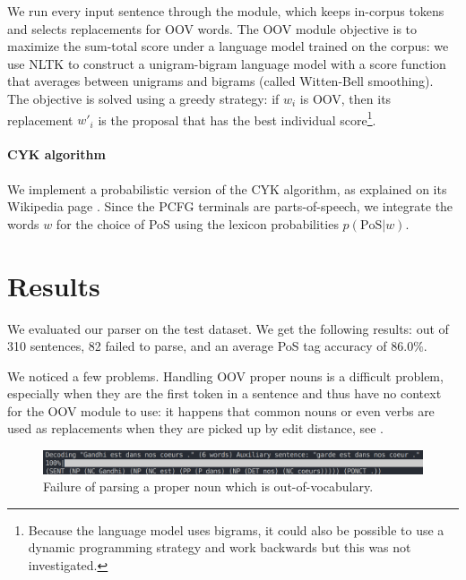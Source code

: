 \documentclass[11pt]{article}
\begin{document}
We run every input sentence through the module, which keeps in-corpus tokens and selects replacements for OOV words. The OOV module objective is to maximize the sum-total score under a language model trained on the corpus: we use NLTK to construct a unigram-bigram language model with a score function that averages between unigrams and bigrams (called Witten-Bell smoothing). The objective is solved using a greedy strategy: if $w_i$ is OOV, then its replacement $w'_i$ is the proposal that has the best individual score\footnote{Because the language model uses bigrams, it could also be possible to use a dynamic programming strategy and work backwards but this was not investigated.}.

\paragraph{CYK algorithm}

We implement a probabilistic version of the CYK algorithm, as explained on its Wikipedia page \cite{wiki:CYK}. Since the PCFG terminals are parts-of-speech, we integrate the words $w$ for the choice of PoS using the lexicon probabilities $p(\mathrm{PoS}|w)$.

\section{Results}


We evaluated our parser on the test dataset. We get the following results: out of 310 sentences, 82 failed to parse, and an average PoS tag accuracy of $86.0\%$.

We noticed a few problems. Handling OOV proper nouns is a difficult problem, especially when they are the first token in a sentence and thus have no context for the OOV module to use: it happens that common nouns or even verbs are used as replacements when they are picked up by edit distance, see .

\begin{figure}[ht!]
	\centering
	\includegraphics[width=\linewidth]{gandhi-garde.png}
	\caption{Failure of parsing a proper noun which is out-of-vocabulary.}
	\label{fig:npParseFailure_didiersoulage}
\end{figure}


\printbibliography{}
\end{document}
